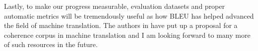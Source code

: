 
Lastly, to make our progress measurable, evaluation datasets and proper automatic metrics will be tremendously useful as how BLEU \cite{Papineni02bleu} has helped advanced the field of machine translation. The authors in \cite{smith15} have put up a proposal for a coherence corpus in machine translation and I am looking forward to many more of such resources in the future.


